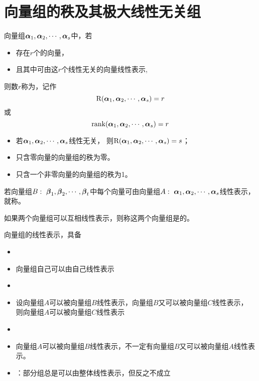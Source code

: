 \section{向量组的秩及其极大线性无关组}

\begin{frame}
\begin{dingyi}[向量组的秩]
  向量组$\boldsymbol{\alpha}_1,\boldsymbol{\alpha}_2,\cdots,\boldsymbol{\alpha}_s$中，若
  \begin{itemize}
  \item 存在$r$个的向量，
  \item 且其中可由这$r$个线性无关的向量线性表示, 
  \end{itemize}
  则数$r$称为，记作
  $$
  \mathrm{R}(\boldsymbol{\alpha}_1,\boldsymbol{\alpha}_2,\cdots,\boldsymbol{\alpha}_s)=r
  $$
  或
  $$
  \mathrm{rank}(\boldsymbol{\alpha}_1,\boldsymbol{\alpha}_2,\cdots,\boldsymbol{\alpha}_s)=r
  $$
\end{dingyi}

\end{frame}

\begin{frame}
\begin{itemize}
\item 若$\boldsymbol{\alpha}_1,\boldsymbol{\alpha}_2,\cdots,\boldsymbol{\alpha}_s$线性无关，
  则$\mathrm{R}(\boldsymbol{\alpha}_1,\boldsymbol{\alpha}_2,\cdots,\boldsymbol{\alpha}_s)=s$；
\item 只含零向量的向量组的秩为零。
\item 只含一个非零向量的向量组的秩为1。
\end{itemize}
\end{frame}

\begin{frame}
\begin{dingyi}
  若向量组$B:~\boldsymbol{\beta}_1,\boldsymbol{\beta}_2,\cdots,\boldsymbol{\beta}_t$中每个向量可由向量组$A:~\boldsymbol{\alpha}_1,\boldsymbol{\alpha}_2,\cdots,\boldsymbol{\alpha}_s$线性表示，
  就称。 
  \vspace{0.1in}
  
  如果两个向量组可以互相线性表示，则称这两个向量组是的。
\end{dingyi}
\end{frame}

\begin{frame}
向量组的线性表示，具备
\begin{itemize}
\item {}
\item[]向量组自己可以由自己线性表示  
\item {}
\item[] 设向量组$A$可以被向量组$B$线性表示，向量组$B$又可以被向量组$C$线性表示，
  则向量组$A$可以被向量组$C$线性表示  
\item {}
\item[] 向量组$A$可以被向量组$B$线性表示，不一定有向量组$B$又可以被向量组$A$线性表示。  
\item[] ：部分组总是可以由整体线性表示，但反之不成立
\end{itemize} 
\end{frame}

